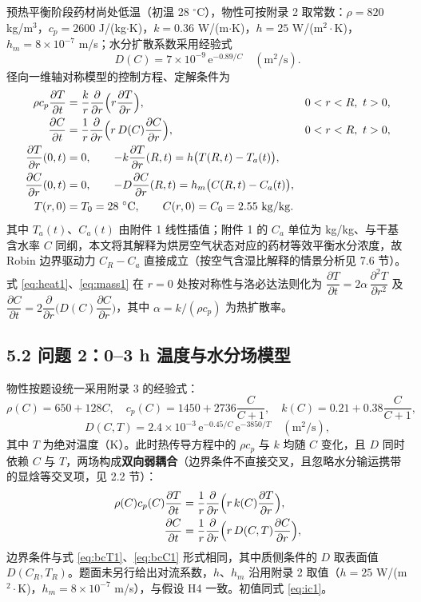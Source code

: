 \documentclass[12pt,a4paper]{ctexart}
\newcommand{\pdd}[2]{\dfrac{\partial #1}{\partial #2}}
\begin{document}
预热平衡阶段药材尚处低温（初温 28 $^\circ$C），物性可按附录 2 取常数：$\rho=820$ kg/m$^3$，$c_p=2600$ J/(kg$\cdot$K)，$k=0.36$ W/(m$\cdot$K)，$h=25$ W/(m$^2\!\cdot$K)，$h_m=8\times10^{-7}$ m/s；水分扩散系数采用经验式
\begin{equation}
D(C)=7\times10^{-9}\,\mathrm{e}^{-0.89/C}\quad(\mathrm{m^2/s}).
\label{eq:D1}
\end{equation}
径向一维轴对称模型的控制方程、定解条件为
\begin{align}
\rho c_p\pdd{T}{t}&=\frac{k}{r}\pdd{}{r}\Bigl(r\pdd{T}{r}\Bigr), & 0<r<R,\ t>0, \label{eq:heat1}\\
\pdd{C}{t}&=\frac{1}{r}\pdd{}{r}\Bigl(r\,D(C)\pdd{C}{r}\Bigr), & 0<r<R,\ t>0, \label{eq:mass1}\\
\pdd{T}{r}(0,t)&=0,\qquad -k\pdd{T}{r}(R,t)=h\bigl(T(R,t)-T_a(t)\bigr), \label{eq:bcT1}\\
\pdd{C}{r}(0,t)&=0,\qquad -D\pdd{C}{r}(R,t)=h_m\bigl(C(R,t)-C_a(t)\bigr), \label{eq:bcC1}\\
T(r,0)&=T_0=28\ ^\circ\mathrm{C},\qquad C(r,0)=C_0=2.55\ \mathrm{kg/kg}. \label{eq:ic1}
\end{align}
其中 $T_a(t)$、$C_a(t)$ 由附件 1 线性插值；附件 1 的 $C_a$ 单位为 kg/kg、与干基含水率 $C$ 同纲，本文将其解释为烘房空气状态对应的药材等效平衡水分浓度，故 Robin 边界驱动力 $C_R-C_a$ 直接成立（按空气含湿比解释的情景分析见 7.6 节）。式 \eqref{eq:heat1}、\eqref{eq:mass1} 在 $r=0$ 处按对称性与洛必达法则化为 $\pdd{T}{t}=2\alpha\,\pdd{^2T}{r^2}$ 及 $\pdd{C}{t}=2\pdd{}{r}\!\bigl(D(C)\pdd{C}{r}\bigr)$，其中 $\alpha=k/(\rho c_p)$ 为热扩散率。

\subsection{5.2 问题 2：0--3 h 温度与水分场模型}

物性按题设统一采用附录 3 的经验式：
\begin{equation}
\rho(C)=650+128C,\quad c_p(C)=1450+2736\frac{C}{C+1},\quad k(C)=0.21+0.38\frac{C}{C+1},
\label{eq:props3}
\end{equation}
\begin{equation}
D(C,T)=2.4\times10^{-3}\,\mathrm{e}^{-0.45/C}\,\mathrm{e}^{-3850/T}\quad(\mathrm{m^2/s}),
\label{eq:D3}
\end{equation}
其中 $T$ 为绝对温度（K）。此时热传导方程中的 $\rho c_p$ 与 $k$ 均随 $C$ 变化，且 $D$ 同时依赖 $C$ 与 $T$，两场构成\textbf{双向弱耦合}（边界条件不直接交叉，且忽略水分输运携带的显焓等交叉项，见 2.2 节）：
\begin{align}
\rho(C)c_p(C)\pdd{T}{t}&=\frac{1}{r}\pdd{}{r}\Bigl(r\,k(C)\pdd{T}{r}\Bigr), \label{eq:heat23}\\
\pdd{C}{t}&=\frac{1}{r}\pdd{}{r}\Bigl(r\,D(C,T)\pdd{C}{r}\Bigr), \label{eq:mass23}
\end{align}
边界条件与式 \eqref{eq:bcT1}、\eqref{eq:bcC1} 形式相同，其中质侧条件的 $D$ 取表面值 $D(C_R,T_R)$。题面未另行给出对流系数，$h$、$h_m$ 沿用附录 2 取值（$h=25$ W/(m$^2\!\cdot$K)，$h_m=8\times10^{-7}$ m/s），与假设 H4 一致。初值同式 \eqref{eq:ic1}。
\end{document}
